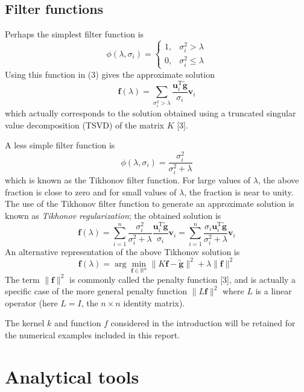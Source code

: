 \documentclass[12pt]{article}
\newcommand{\gnoise}{\widetilde{\mathbf{g}}}
\newcommand{\kmat}{K}	%
\newcommand{\fdis}{\mathbf{f}}
\newcommand{\trans}{\mathrm{T}}	%
\newcommand{\regparam}{\lambda}
\newcommand{\filt}{\phi}
\newcommand{\singular}{\sigma}	%
\newcommand{\LSV}{\mathbf{u}}	%
\newcommand{\RSV}{\mathbf{v}}	%
\begin{document}
\subsection{Filter functions}
Perhaps the simplest filter function is
\[\filt(\regparam,\singular_i) = \begin{cases}
1, & \singular_i^2 > \regparam \\
0, & \singular_i^2 \leq \regparam
\end{cases}\]
Using this function in (3) gives the approximate solution
\[\fdis(\regparam) = \sum_{\singular_i^2 > \regparam} \frac{{\LSV^\trans_i}\gnoise}{\singular_i}\RSV_i\]
which actually corresponds to the solution obtained using a truncated singular value decomposition (TSVD) of the matrix $\kmat$ [3]. \par
A less simple filter function is
\begin{equation}
\filt(\regparam,\singular_i)  = \frac{\singular_i^2}{\singular_i^2 + \regparam}
\end{equation}
which is known as the Tikhonov filter function. For large values of $\regparam$, the above fraction is close to zero and for small values of $\regparam$, the fraction is near to unity. The use of the Tikhonov filter function to generate an approximate solution is known as \textit{Tikhonov regularization}; the obtained solution is
\[\fdis(\regparam) = \sum_{i = 1}^n \frac{\singular_i^2}{\singular_i^2 + \regparam}\frac{{\LSV^\trans_i}\gnoise}{\singular_i}\RSV_i = \sum_{i = 1}^n \frac{\singular_i{\LSV^\trans_i}\gnoise}{\singular_i^2 + \regparam}\RSV_i \]
An alternative representation of the above Tikhonov solution is
\begin{equation}
\fdis(\regparam) = \arg\min_{\fdis \in \mathbb{R}^n} \|\kmat\fdis - \gnoise\|^2 + \regparam\|\fdis\|^2
\end{equation}
The term $\|\fdis\|^2$ is commonly called the penalty function [3], and is actually a specific case of the more general penalty function $\|L\fdis\|^2$ where $L$ is a linear operator (here $L = I$, the $n \times n$ identity matrix).

The kernel $k$ and function $f$ considered in the introduction will be retained for the numerical examples included in this report.

\section{Analytical tools}
\end{document}
